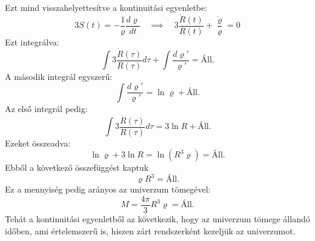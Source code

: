 \documentclass[../main.tex]{subfiles}
\begin{document}
Ezt mind visszahelyettesítve a kontinuitási egyenletbe:
\begin{equation}
    3 S(t) = - \frac{1}{\varrho} \frac{d \varrho}{d t} \quad \implies \quad 3 \frac{\dot{R}(t)}{R(t)} + \frac{\dot{\varrho}}{\varrho} = 0
\end{equation}
Ezt integrálva:
\begin{equation}
    \int 3 \frac{\dot{R}(\tau)}{R(\tau)} d \tau + \int \frac{d \varrho'}{\varrho'} = \text{Áll.}
\end{equation}
A második integrál egyszerű:
\begin{equation}
    \int \frac{d \varrho'}{\varrho'} = \ln \varrho + \text{Áll.}
\end{equation}
Az első integrál pedig:
\begin{equation}
    \int 3 \frac{\dot{R}(\tau)}{R(\tau)} d \tau = 3 \ln R + \text{Áll.}
\end{equation}
Ezeket összeadva:
\begin{equation}
    \ln \varrho + 3 \ln R = \ln \left(R^3 \varrho\right) = \text{Áll.}
\end{equation}
Ebből a következő összefüggést kaptuk
\begin{equation}
    \varrho R^3 = \text{Áll.}
\end{equation}
Ez a mennyiség pedig arányos az univerzum tömegével:
\begin{equation}
    M = \frac{4\pi}{3} R^3 \varrho = \text{Áll.}
\end{equation}
Tehát a kontinuitási egyenletből az következik, hogy az univerzum tömege állandó időben, ami értelemszerű is, hiszen zárt rendszerként kezeljük az univerzumot.
\end{document}
